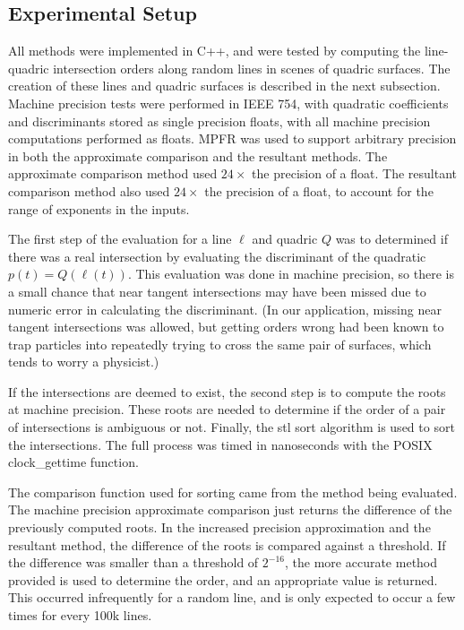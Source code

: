 \documentclass{cccg16}
\begin{document}
\subsection{Experimental Setup}
All methods were implemented in C++, and were tested by computing the
line-quadric intersection orders along random lines in scenes of
quadric surfaces. The creation of these lines and quadric surfaces is
described in the next subsection.  Machine precision tests were
performed in IEEE 754, with quadratic coefficients and discriminants
stored as single precision floats, with all machine precision
computations performed as floats.  MPFR\cite{mpfr} was used to support
arbitrary precision in both the approximate comparison and the
resultant methods.  The approximate comparison method used $24\times$
the precision of a float.  The resultant comparison method also used
$24\times$ the precision of a float, to account for the range of
exponents in the inputs.

The first step of the evaluation for a line $\ell$ and quadric $Q$ was
to determined if there was a real intersection by evaluating the
discriminant of the quadratic~$p(t)=Q(\ell(t))$.  This evaluation was
done in machine precision, so there is a small chance that near
tangent intersections may have been missed due to numeric error in
calculating the discriminant. (In our application, missing near
tangent intersections was allowed, but getting orders wrong had been
known to trap particles into repeatedly trying to cross the same pair
of surfaces, which tends to worry a physicist.)

If the intersections are deemed to exist, the second step is to
compute the roots at machine precision.  These roots are needed to
determine if the order of a pair of intersections is ambiguous or not.
Finally, the stl sort algorithm is used to sort the intersections.
The full process was timed in nanoseconds with the POSIX
clock\_gettime function.

The comparison function used for sorting came from the method being
evaluated.  The machine precision approximate comparison just returns
the difference of the previously computed roots.  In the increased
precision approximation and the resultant method, the difference of
the roots is compared against a threshold.  If the difference was
smaller than a threshold of $2^{-16}$, the more accurate method
provided is used to determine the order, and an appropriate value is
returned.  This occurred infrequently for a random line, and is only
expected to occur a few times for every 100k lines.
\end{document}
